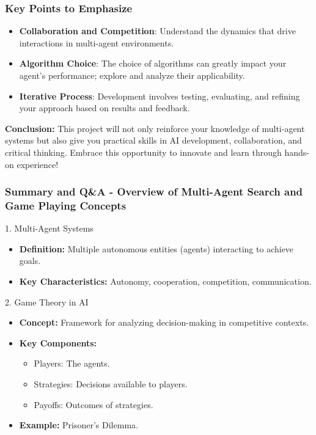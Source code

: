\documentclass[aspectratio=169]{beamer}
\begin{document}
\begin{frame}[fragile]
    \frametitle{Key Points to Emphasize}
    \begin{itemize}
        \item \textbf{Collaboration and Competition}: Understand the dynamics that drive interactions in multi-agent environments.
        \item \textbf{Algorithm Choice}: The choice of algorithms can greatly impact your agent's performance; explore and analyze their applicability.
        \item \textbf{Iterative Process}: Development involves testing, evaluating, and refining your approach based on results and feedback.
    \end{itemize}
    \textbf{Conclusion:} This project will not only reinforce your knowledge of multi-agent systems but also give you practical skills in AI development, collaboration, and critical thinking. Embrace this opportunity to innovate and learn through hands-on experience!
\end{frame}

\begin{frame}[fragile]
    \frametitle{Summary and Q\&A - Overview of Multi-Agent Search and Game Playing Concepts}
    
    \begin{block}{1. Multi-Agent Systems}
        \begin{itemize}
            \item \textbf{Definition:} Multiple autonomous entities (agents) interacting to achieve goals.
            \item \textbf{Key Characteristics:} Autonomy, cooperation, competition, communication.
        \end{itemize}
    \end{block}

    \begin{block}{2. Game Theory in AI}
        \begin{itemize}
            \item \textbf{Concept:} Framework for analyzing decision-making in competitive contexts.
            \item \textbf{Key Components:}
            \begin{itemize}
                \item Players: The agents.
                \item Strategies: Decisions available to players.
                \item Payoffs: Outcomes of strategies.
            \end{itemize}
            \item \textbf{Example:} Prisoner's Dilemma.
        \end{itemize}
    \end{block}
\end{frame}
\end{document}
